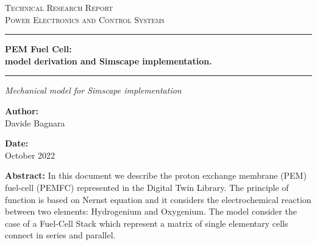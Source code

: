 \documentclass[12pt,a4paper]{scrartcl}
\newcommand{\DocCategory}{Technical Research Report}
\newcommand{\DocField}{Power Electronics and Control Systems}
\newcommand{\DocTitle}{%
	{\fontsize{24}{24}\selectfont\bfseries PEM Fuel Cell:} \\[16pt]
	{\fontsize{16}{20}\selectfont\bfseries model derivation and Simscape implementation.}
}
\newcommand{\DocSubtitle}{%
	Mechanical model for Simscape implementation
}
\newcommand{\DocAuthor}{Davide Bagnara}
\newcommand{\DocDate}{October 2022}
\newcommand{\DocAbstract}{%
{In this document we describe the proton exchange membrane (PEM) fuel-cell (PEMFC) represented in the Digital Twin Library. The principle of function is based on Nernst equation and it considers the electrochemical reaction between two elements: Hydrogenium and Oxygenium. The model consider the case of a Fuel-Cell Stack which represent a matrix of single elementary cells connect in series and parallel.}
}
\begin{document}
	\titlepage
	\begin{center}
		{\Large\scshape \DocCategory}\\[8pt]
		{\large\scshape \DocField}
	\end{center}
	
	\vspace{36pt}
	\noindent\rule{\linewidth}{0.8pt}
	
	\vspace{16pt}
	\begin{center}
		\DocTitle
	\end{center}
	
	\vspace{4pt}
	\noindent\rule{\linewidth}{2.2pt}
	
	\begin{center}
		\begin{onehalfspace}
			{\large\itshape \DocSubtitle}
		\end{onehalfspace}
	\end{center}
	
	\vspace{18pt}
	
	\begin{minipage}{0.92\linewidth}
		\noindent
		\begin{minipage}[t]{0.48\linewidth}
			\textbf{Author:}\\[2pt]
			\DocAuthor
		\end{minipage}%
		\hfill
		\begin{minipage}[t]{0.48\linewidth}
			\raggedleft
			\textbf{Date:}\\[2pt]
			\DocDate
		\end{minipage}
	\end{minipage}
	\vspace{36pt}
	
	\begin{center}
		\begin{minipage}{0.85\linewidth}
			\footnotesize 
			\begin{onehalfspace}
				\textbf{Abstract:} \DocAbstract
			\end{onehalfspace}
		\end{minipage}
	\end{center}
	
\end{document}
